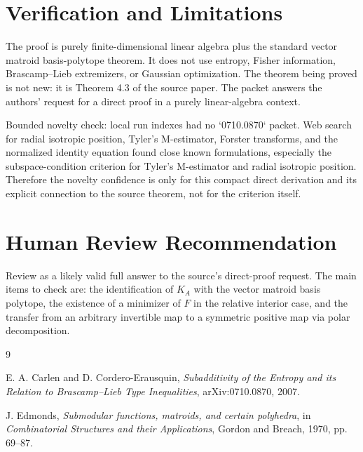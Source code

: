 \documentclass[11pt]{article}
\begin{document}
\section*{Verification and Limitations}

The proof is purely finite-dimensional linear algebra plus the standard vector
matroid basis-polytope theorem.  It does not use entropy, Fisher information,
Brascamp--Lieb extremizers, or Gaussian optimization.  The theorem being proved
is not new: it is Theorem 4.3 of the source paper.  The packet answers the
authors' request for a direct proof in a purely linear-algebra context.

Bounded novelty check: local run indexes had no `0710.0870` packet.  Web search
for radial isotropic position, Tyler's M-estimator, Forster transforms, and the
normalized identity equation found close known formulations, especially the
subspace-condition criterion for Tyler's M-estimator and radial isotropic
position.  Therefore the novelty confidence is only for this compact direct
derivation and its explicit connection to the source theorem, not for the
criterion itself.

\section*{Human Review Recommendation}

Review as a likely valid full answer to the source's direct-proof request.
The main items to check are: the identification of \(K_A\) with the vector
matroid basis polytope, the existence of a minimizer of \(F\) in the relative
interior case, and the transfer from an arbitrary invertible map to a symmetric
positive map via polar decomposition.

\begin{thebibliography}{9}

E. A. Carlen and D. Cordero-Erausquin,
\emph{Subadditivity of the Entropy and its Relation to Brascamp--Lieb Type
Inequalities}, arXiv:0710.0870, 2007.

J. Edmonds,
\emph{Submodular functions, matroids, and certain polyhedra},
in \emph{Combinatorial Structures and their Applications}, Gordon and Breach,
1970, pp. 69--87.

\end{thebibliography}
\end{document}
